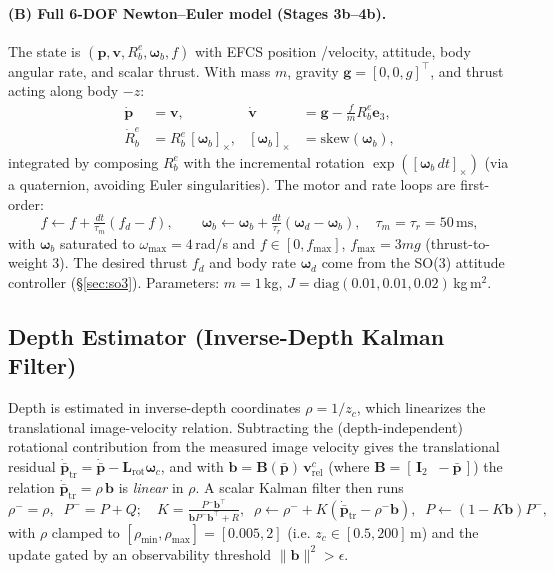 \documentclass[11pt]{article}
\begin{document}
\paragraph{(B) Full 6-DOF Newton--Euler model (Stages 3b--4b).}
\label{sec:6dof}
The state is $(\mathbf p,\mathbf v,R_b^e,\bm\omega_b,f)$ with EFCS position
/velocity, attitude, body angular rate, and scalar thrust. With mass $m$,
gravity $\mathbf g=[0,0,g]^\top$, and thrust acting along body $-z$:
\begin{align}
\dot{\mathbf p}&=\mathbf v, &
\dot{\mathbf v}&=\mathbf g-\tfrac{f}{m}R_b^e\mathbf e_3, \label{eq:newton}\\
\dot R_b^e&=R_b^e\,[\bm\omega_b]_\times, &
[\bm\omega_b]_\times&=\text{skew}(\bm\omega_b),
\end{align}
integrated by composing $R_b^e$ with the incremental rotation
$\exp([\bm\omega_b\,dt]_\times)$ (via a quaternion, avoiding Euler
singularities). The motor and rate loops are first-order:
\begin{equation}
f\leftarrow f+\tfrac{dt}{\tau_m}(f_d-f),\qquad
\bm\omega_b\leftarrow\bm\omega_b+\tfrac{dt}{\tau_r}(\bm\omega_d-\bm\omega_b),
\quad \tau_m=\tau_r=50\,\text{ms},
\end{equation}
with $\bm\omega_b$ saturated to $\omega_{\max}=4\,$rad/s and
$f\in[0,f_{\max}]$, $f_{\max}=3mg$ (thrust-to-weight 3). The desired thrust
$f_d$ and body rate $\bm\omega_d$ come from the SO(3) attitude controller
(\S\ref{sec:so3}). Parameters: $m=1\,$kg, $J=\mathrm{diag}(0.01,0.01,0.02)\,$kg\,m$^2$.

\subsection{Depth Estimator (Inverse-Depth Kalman Filter)}
\label{sec:depth}
Depth is estimated in inverse-depth coordinates $\rho=1/z_c$, which linearizes
the translational image-velocity relation. Subtracting the (depth-independent)
rotational contribution from the measured image velocity gives the
translational residual $\dot{\bar{\mathbf p}}_\text{tr}=
\dot{\bar{\mathbf p}}-\mathbf L_\text{rot}\bm\omega_c$, and with
$\mathbf b=\mathbf B(\bar{\mathbf p})\,\mathbf v_\text{rel}^c$ (where
$\mathbf B=[\,\mathbf I_2\;\;-\bar{\mathbf p}\,]$) the relation
$\dot{\bar{\mathbf p}}_\text{tr}=\rho\,\mathbf b$ is \emph{linear} in $\rho$.
A scalar Kalman filter then runs
\begin{equation}
\rho^-=\rho,\;\;P^-=P+Q;\quad
K=\tfrac{P^- \mathbf b^\top}{\mathbf b P^-\mathbf b^\top+R},\;\;
\rho\leftarrow\rho^-+K(\dot{\bar{\mathbf p}}_\text{tr}-\rho^-\mathbf b),\;\;
P\leftarrow(1-K\mathbf b)P^-,
\end{equation}
with $\rho$ clamped to $[\rho_{\min},\rho_{\max}]=[0.005,2]$ (i.e.
$z_c\in[0.5,200]\,$m) and the update gated by an observability threshold
$\lVert\mathbf b\rVert^2>\epsilon$.
\end{document}

